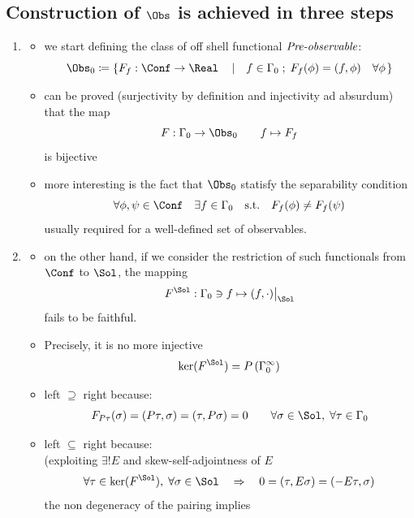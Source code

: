 \documentclass[a4paper,11pt]{scrartcl}
\begin{document}
    \subsection{Construction of $\Obs$ is achieved in three steps}
    \begin{enumerate}
        \item 
            \begin{itemize}
                \item we start defining the class of off shell functional $\emph{Pre-observable}$:
                    $$\Obs_0 \coloneqq \left\{ F_f:\Conf \rightarrow \Real \quad \left\vert \quad f \in \Gamma_0 \; ; \; F_f(\phi) = (f,\phi) \quad\forall \phi \right. \right\}$$
                \item can be proved (surjectivity by definition and injectivity ad absurdum) that the map
                $$F: \Gamma_0 \rightarrow \Obs_0 \qquad f \mapsto F_f$$
                is bijective
                \item more interesting is the fact that $\Obs_0$ statisfy the separability condition
                $$ \forall \phi, \psi \in \Conf \quad \exists f \in \Gamma_0 \quad \textrm{s.t.} \quad F_f(\phi) \neq F_f(\psi)$$
                usually required for a well-defined set of observables.
            \end{itemize}
        \item
            \begin{itemize}
                \item on the other hand, if we consider the restriction of such functionals from $\Conf$ to $\Sol$,
                the mapping 
                $$ F^\Sol : \Gamma_0  \ni f \mapsto (f,\cdot) \big\vert_\Sol $$
                fails to be faithful.
                \item Precisely,  it is no more injective
                $$ \ker(F^\Sol) = P \left( \Gamma_0^\infty \right)$$
                \item left $\supseteq$ right because:
                $$ F_{P\tau} ( \sigma ) = ( P\tau, \sigma ) = (\tau , P\sigma) = 0 \qquad \forall \sigma \in \Sol , \; \forall \tau \in \Gamma_0$$
                \item left $\subseteq$ right because: \\
                (exploiting $\exists ! E$ and skew-self-adjointness of $E$
                $$ \forall \tau \in \ker(F^\Sol) , \; \forall \sigma \in \Sol \quad \Rightarrow \quad 0 = ( \tau , E \sigma) = (-E\tau, \sigma)$$
                the non degeneracy of the pairing implies

\end{itemize}
\end{enumerate}
\end{document}
